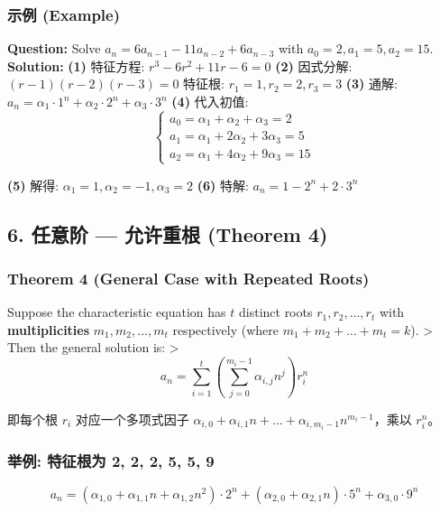 \documentclass[10pt,a4paper,openany]{ctexbook}
\theoremstyle{definition}
\theoremstyle{remark}
\renewenvironment{quote}
  {\list{}{\leftmargin=1em\rightmargin=0pt\topsep=0.5pt\partopsep=0pt}\item[]}
  {\endlist}
\begin{document}
\subsubsection{示例 (Example)}

\textbf{Question:} Solve $a_n = 6a_{n-1} - 11a_{n-2} + 6a_{n-3}$ with $a_0 = 2, a_1 = 5, a_2 = 15$.
\textbf{Solution:}
\textbf{(1)} 特征方程: $r^3 - 6r^2 + 11r - 6 = 0$
\textbf{(2)} 因式分解: $(r-1)(r-2)(r-3) = 0$
特征根: $r_1 = 1, r_2 = 2, r_3 = 3$
\textbf{(3)} 通解: $a_n = \alpha_1 \cdot 1^n + \alpha_2 \cdot 2^n + \alpha_3 \cdot 3^n$
\textbf{(4)} 代入初值:
\[
\begin{cases}
a_0 = \alpha_1 + \alpha_2 + \alpha_3 = 2 \\
a_1 = \alpha_1 + 2\alpha_2 + 3\alpha_3 = 5 \\
a_2 = \alpha_1 + 4\alpha_2 + 9\alpha_3 = 15
\end{cases}
\]

\textbf{(5)} 解得: $\alpha_1 = 1, \alpha_2 = -1, \alpha_3 = 2$
\textbf{(6)} 特解: $a_n = 1 - 2^n + 2 \cdot 3^n$
\vspace{-2pt}

\subsection{6. 任意阶 — 允许重根 (Theorem 4)}

\subsubsection{Theorem 4 (General Case with Repeated Roots)}

\begin{quote}
Suppose the characteristic equation has $t$ distinct roots $r_1, r_2, \dots, r_t$ with \textbf{multiplicities} $m_1, m_2, \dots, m_t$ respectively (where $m_1 + m_2 + \dots + m_t = k$).
>
Then the general solution is:
>
\[
a_n = \sum_{i=1}^{t} \left( \sum_{j=0}^{m_i-1} \alpha_{i,j} n^j \right) r_i^n
\]


即每个根 $r_i$ 对应一个多项式因子 $\alpha_{i,0} + \alpha_{i,1} n + \dots + \alpha_{i,m_i-1} n^{m_i-1}$，乘以 $r_i^n$。

\end{quote}

\subsubsection{举例: 特征根为 2, 2, 2, 5, 5, 9}

\[
a_n = (\alpha_{1,0} + \alpha_{1,1} n + \alpha_{1,2} n^2) \cdot 2^n + (\alpha_{2,0} + \alpha_{2,1} n) \cdot 5^n + \alpha_{3,0} \cdot 9^n
\]
\end{document}
